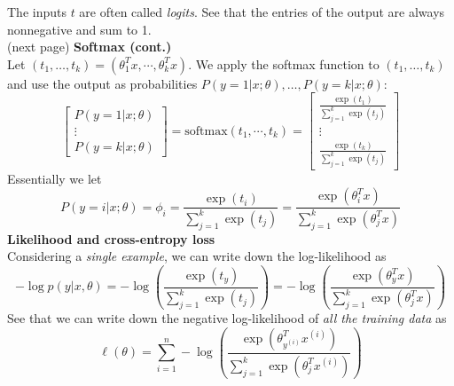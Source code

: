 \documentclass{report}
\begin{document}
The inputs $t$ are often called \textit{logits}. See that the entries of the output are always
nonnegative and sum to 1.\\
(next page)
\newpage
\noindent\textbf{Softmax (cont.)}\\
Let $(t_1,\ldots,t_k)=(\theta_1^Tx,\cdots,\theta_k^Tx)$.
We apply the softmax function to $(t_1,\ldots,t_k)$ and use the output as probabilities
$P(y=1|x;\theta),\ldots,P(y=k|x;\theta)$:
\begin{equation*}
\begin{bmatrix}P(y=1|x;\theta)\\\vdots\\P(y=k|x;\theta)
\end{bmatrix}=\text{softmax}(t_1,\cdots,t_k)=
\begin{bmatrix}
\frac{\exp(t_1)}{\sum^k_{j=1}\exp(t_j)}\\\vdots\\
\frac{\exp(t_k)}{\sum^k_{j=1}\exp(t_j)}\end{bmatrix}
\end{equation*}
Essentially we let
\begin{equation*}
P(y=i|x;\theta)=\phi_i=\frac{\exp(t_i)}{\sum^k_{j=1}\exp(t_j)}=\frac{\exp(\theta_i^Tx)}{\sum^k_{j=1}
\exp(\theta_j^Tx)}
\end{equation*}
\textbf{Likelihood and cross-entropy loss}\\
Considering a \textit{single example}, we can write down
the log-likelihood as
\begin{equation*}
-\log p(y|x,\theta)=-\log\left(\frac{\exp(t_y)}{\sum^k_{j=1}\exp(t_j)}\right)
=-\log\left(\frac{\exp(\theta_y^Tx)}{\sum^k_{j=1}\exp(\theta_j^Tx)}\right)
\end{equation*}
See that we can write down the negative log-likelihood of \textit{all the training data} as
\begin{equation*}
\ell(\theta)=\sum^n_{i=1}-\log\left(\frac{\exp(\theta_{y^{(i)}}^Tx^{(i)})}{\sum^k_{j=1}
\exp(\theta_j^Tx^{(i)})}\right)
\end{equation*}
\end{document}
